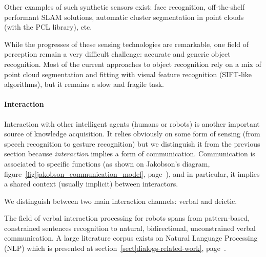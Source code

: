 Other examples of such synthetic sensors exist: face recognition, off-the-shelf
performant SLAM solutions, automatic cluster segmentation in point clouds (with
the PCL library), etc.

While the progresses of these sensing technologies are remarkable, one field of
perception remain a very difficult challenge: accurate and generic object
recognition. Most of the current approaches to object recognition rely on a mix
of point cloud segmentation and fitting with visual feature recognition
(SIFT-like algorithms), but it remains a slow and fragile task.


\paragraph{Interaction}

Interaction with other intelligent agents (humans or robots) is another
important source of knowledge acquisition. It relies obviously on some form of
sensing (from speech recognition to gesture recognition) but we distinguish it
from the previous section because \emph{interaction} implies a form of
communication. Communication is associated to specific functions
(as shown on Jakobson's diagram, figure~\ref{fig|jakobson_communication_model},
page~\pageref{fig|jakobson_communication_model}), and in particular, it implies
a shared context (usually implicit) between interactors.

We distinguish between two main interaction channels: verbal and deictic.

\begin{scriptsize}
\begin{center}
\end{center}
\end{scriptsize}

\label{sect|nlp}

The field of verbal interaction processing for robots spans from pattern-based,
constrained sentences recognition to natural, bidirectional, unconstrained
verbal communication. A large literature corpus exists on Natural Language
Processing (NLP) which is presented at section~\ref{sect|dialogs-related-work},
page~\pageref{sect|dialogs-related-work}.

